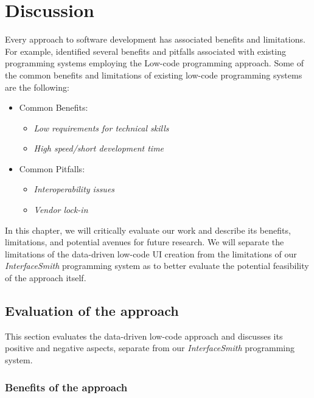 \chapter{Discussion}
\label{chap:discussion}

Every approach to software development has associated benefits and limitations.
For example, \citet{Pinho_Aguiar_Amaral_2023} identified several benefits and pitfalls associated with existing programming systems employing the Low-code programming approach.
Some of the common benefits and limitations of existing low-code programming systems are the following:
\begin{itemize}
	\item Common Benefits:
	      \begin{itemize}
		      \item \emph{Low requirements for technical skills}
		      \item \emph{High speed/short development time}
	      \end{itemize}

	\item Common Pitfalls:
	      \begin{itemize}
		      \item \emph{Interoperability issues}
		      \item \emph{Vendor lock-in}
	      \end{itemize}
\end{itemize}

\noindent In this chapter, we will critically evaluate our work and describe its benefits, limitations, and potential avenues for future research.
We will separate the limitations of the data-driven low-code UI creation from the limitations of our \emph{InterfaceSmith} programming system as to
better evaluate the potential feasibility of the approach itself.

\section{Evaluation of the approach}
This section evaluates the data-driven low-code approach and discusses its positive and negative aspects, separate from our \emph{InterfaceSmith} programming system.

\subsection{Benefits of the approach}

